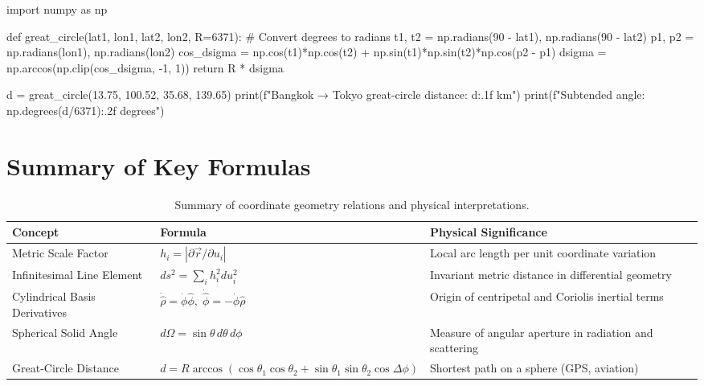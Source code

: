 \begin{pythonbox}
import numpy as np

def great_circle(lat1, lon1, lat2, lon2, R=6371):
    # Convert degrees to radians
    t1, t2 = np.radians(90 - lat1), np.radians(90 - lat2)
    p1, p2 = np.radians(lon1), np.radians(lon2)
    cos_dsigma = np.cos(t1)*np.cos(t2) + np.sin(t1)*np.sin(t2)*np.cos(p2 - p1)
    dsigma = np.arccos(np.clip(cos_dsigma, -1, 1))
    return R * dsigma

d = great_circle(13.75, 100.52, 35.68, 139.65)
print(f"Bangkok → Tokyo great-circle distance: {d:.1f} km")
print(f"Subtended angle: {np.degrees(d/6371):.2f} degrees")
\end{pythonbox}

\section{Summary of Key Formulas}
\begin{table}[H]
\centering
\small
\begin{tabularx}{\textwidth}{llX}
\toprule
\textbf{Concept} & \textbf{Formula} & \textbf{Physical Significance} \\
\midrule
Metric Scale Factor & $h_i = |\partial\vec{r}/\partial u_i|$ & Local arc length per unit coordinate variation \\
Infinitesimal Line Element & $ds^2 = \sum_{i} h_i^2 du_i^2$ & Invariant metric distance in differential geometry \\
Cylindrical Basis Derivatives & $\dot{\hat{\rho}} = \dot{\phi}\hat{\phi}, \; \dot{\hat{\phi}} = -\dot{\phi}\hat{\rho}$ & Origin of centripetal and Coriolis inertial terms \\
Spherical Solid Angle & $d\Omega = \sin\theta\,d\theta\,d\phi$ & Measure of angular aperture in radiation and scattering \\
Great-Circle Distance & $d = R\arccos(\cos\theta_1\cos\theta_2 + \sin\theta_1\sin\theta_2\cos\Delta\phi)$ & Shortest path on a sphere (GPS, aviation) \\
\bottomrule
\end{tabularx}
\caption{Summary of coordinate geometry relations and physical interpretations.}
\label{tab:ch01_summary}
\end{table}

